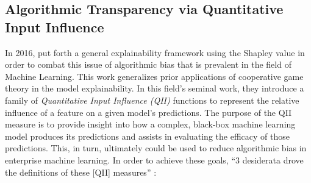 \subsection{Algorithmic Transparency via Quantitative Input Inﬂuence \citep{QII_MS3}}
\label{sec:QII}
In 2016, \citet{QII_MS3} put forth a general explainability framework using the Shapley value in order to combat this issue of algorithmic bias that is prevalent in the field of Machine Learning. This work generalizes prior applications of cooperative game theory in the model explainability.  In this field's seminal work, they introduce a family of \textit{Quantitative Input Influence (QII)} functions to represent the relative influence of a feature on a given model's predictions.  The purpose of the QII measure is to provide insight into how a complex, black-box machine learning model produces its predictions and assists in evaluating the efficacy of those predictions. This, in turn, ultimately could be used to reduce algorithmic bias in enterprise machine learning.   In order to achieve these goals, ``$3$ desiderata drove the definitions of these [QII] measures'' \citep{QII_MS3}:

